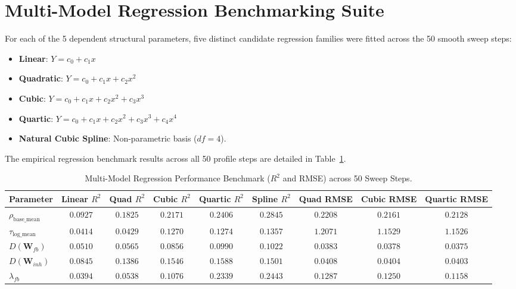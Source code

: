 \documentclass[11pt,a4paper]{article}
\begin{document}
\section{Multi-Model Regression Benchmarking Suite}

For each of the 5 dependent structural parameters, five distinct candidate regression families were fitted across the 50 smooth sweep steps:
\begin{itemize}
    \item \textbf{Linear}: $Y = c_0 + c_1 x$
    \item \textbf{Quadratic}: $Y = c_0 + c_1 x + c_2 x^2$
    \item \textbf{Cubic}: $Y = c_0 + c_1 x + c_2 x^2 + c_3 x^3$
    \item \textbf{Quartic}: $Y = c_0 + c_1 x + c_2 x^2 + c_3 x^3 + c_4 x^4$
    \item \textbf{Natural Cubic Spline}: Non-parametric basis ($df = 4$).
\end{itemize}

The empirical regression benchmark results across all 50 profile steps are detailed in Table~\ref{tab:benchmarks}.

\begin{table}[H]
\centering
\caption{Multi-Model Regression Performance Benchmark ($R^2$ and RMSE) across 50 Sweep Steps.}
\label{tab:benchmarks}
\vspace{0.5em}
\footnotesize
\begin{tabular}{l c c c c c c c c}
\toprule
\textbf{Parameter} & \textbf{Linear $R^2$} & \textbf{Quad $R^2$} & \textbf{Cubic $R^2$} & \textbf{Quartic $R^2$} & \textbf{Spline $R^2$} & \textbf{Quad RMSE} & \textbf{Cubic RMSE} & \textbf{Quartic RMSE} \\
\midrule
$\rho_{\text{base\_mean}}$ & $0.0927$ & $0.1825$ & $0.2171$ & \textbf{$0.2406$} & \textbf{$0.2845$} & $0.2208$ & $0.2161$ & \textbf{$0.2128$} \\
$\tau_{\text{log\_mean}}$  & $0.0414$ & $0.0429$ & $0.1270$ & \textbf{$0.1274$} & \textbf{$0.1357$} & $1.2071$ & $1.1529$ & \textbf{$1.1526$} \\
$D(\mathbf{W}_{fb})$       & $0.0510$ & $0.0565$ & $0.0856$ & \textbf{$0.0990$} & \textbf{$0.1022$} & $0.0383$ & $0.0378$ & \textbf{$0.0375$} \\
$D(\mathbf{W}_{inh})$      & $0.0845$ & $0.1386$ & $0.1546$ & \textbf{$0.1588$} & \textbf{$0.1501$} & $0.0408$ & $0.0404$ & \textbf{$0.0403$} \\
$\lambda_{fb}$             & $0.0394$ & $0.0538$ & $0.1076$ & \textbf{$0.2339$} & \textbf{$0.2443$} & $0.1287$ & $0.1250$ & \textbf{$0.1158$} \\
\bottomrule
\end{tabular}
\end{table}
\end{document}
